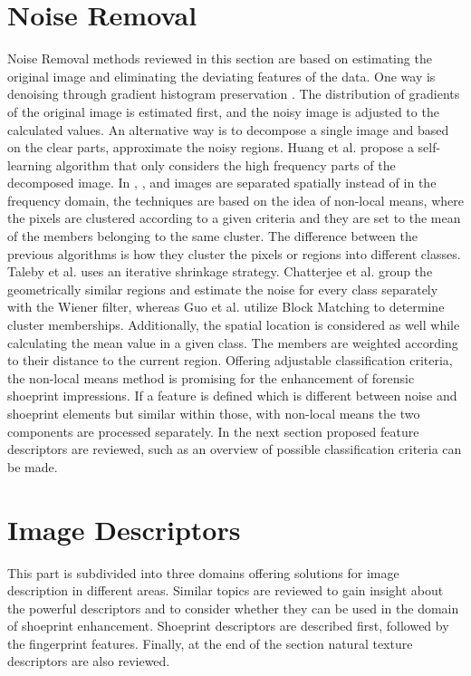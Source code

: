 \documentclass[draft,final]{vutinfth} %
\begin{document}
\section{Noise Removal}

Noise Removal methods reviewed in this section are based on estimating the original image and eliminating the deviating features of the data.
One way is denoising through gradient histogram preservation \cite{zuo2013texture}.
The distribution of gradients  of the original image is estimated first, and the noisy image is adjusted to the calculated values.
An alternative way is to decompose a single image and based on the clear parts, approximate the noisy regions.
Huang et al. \cite{huang2013self} propose a self-learning algorithm that only considers the high frequency parts of the decomposed image.
In \cite{xu2015patch}, \cite{talebi2013global}, \cite{chatterjee2011patch} and \cite{guo2015efficient} images  are separated spatially instead of in the frequency domain, the techniques are based on the idea of non-local means, where the pixels are clustered according to a given criteria and they are set to the mean of the members belonging to the same cluster.
The difference between the previous algorithms is how they cluster the pixels or regions into different classes.
Taleby et al. \cite{talebi2013global} uses an iterative shrinkage strategy. 
Chatterjee et al.  \cite{chatterjee2011patch} group the geometrically similar regions and estimate the noise for every class separately with the Wiener filter, whereas Guo et al. \cite{guo2015efficient} utilize Block Matching to determine cluster memberships. 
Additionally, the spatial location is considered as well while calculating the mean value in a given class.
The members are weighted according to their distance to the current region.
Offering adjustable classification criteria, the non-local means method is promising for the enhancement of forensic shoeprint impressions.
If a feature is defined which is different between noise and shoeprint elements but similar within those, with non-local means the two components are processed separately.
In the next section proposed feature descriptors are reviewed, such as an overview of possible classification criteria can be made.

\section{Image Descriptors}

This part is subdivided into three domains offering solutions for image description in different areas.
Similar topics are reviewed to gain insight about the powerful descriptors and to consider whether they can be used in the domain of shoeprint enhancement.
Shoeprint descriptors are described first, followed by the fingerprint features.
Finally, at the end of the section natural texture descriptors are also reviewed. 
\end{document}
